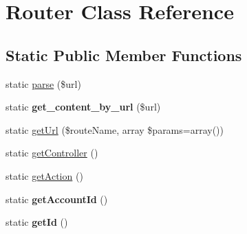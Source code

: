 \hypertarget{class_router}{\section{Router Class Reference}
\label{class_router}
}
\subsection*{Static Public Member Functions}
\begin{DoxyCompactItemize}
\item 
static \hyperlink{class_router_ad6b0d5b03226bb27efd8c410c89ef635}{parse} (\$url)
\item 
\hypertarget{class_router_a7e384b5b08035be60df7696428c6cf56}{static {\bfseries get\-\_\-content\-\_\-by\-\_\-url} (\$url)}\label{class_router_a7e384b5b08035be60df7696428c6cf56}

\item 
static \hyperlink{class_router_a45e9b6bbc2e0abd383bf9a788db25dab}{get\-Url} (\$route\-Name, array \$params=array())
\item 
static \hyperlink{class_router_a0c5216068060ca9253dbad31e5895a2b}{get\-Controller} ()
\item 
static \hyperlink{class_router_af8b331d3ac442a1071aa9f7db3b60637}{get\-Action} ()
\item 
\hypertarget{class_router_a0613d1215434e1b563a42dfcd05aad60}{static {\bfseries get\-Account\-Id} ()}\label{class_router_a0613d1215434e1b563a42dfcd05aad60}

\item 
\hypertarget{class_router_acfaa3a96d0cb5a4c0d4d710dcba41e9e}{static {\bfseries get\-Id} ()}\label{class_router_acfaa3a96d0cb5a4c0d4d710dcba41e9e}

\end{DoxyCompactItemize}


